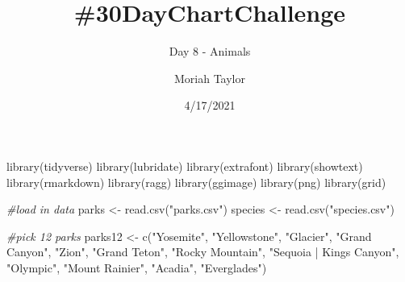 \documentclass[
]{article}
\title{\#30DayChartChallenge}
\subtitle{Day 8 - Animals}
\author{Moriah Taylor}
\date{4/17/2021}
\newenvironment{Shaded}{\begin{snugshade}}{\end{snugshade}}
\newcommand{\CommentTok}[1]{\textcolor[rgb]{0.56,0.35,0.01}{\textit{#1}}}
\newcommand{\FunctionTok}[1]{\textcolor[rgb]{0.00,0.00,0.00}{#1}}
\newcommand{\NormalTok}[1]{#1}
\newcommand{\OtherTok}[1]{\textcolor[rgb]{0.56,0.35,0.01}{#1}}
\newcommand{\StringTok}[1]{\textcolor[rgb]{0.31,0.60,0.02}{#1}}
\begin{document}
\maketitle

\begin{Shaded}
\begin{Highlighting}[]
\FunctionTok{library}\NormalTok{(tidyverse)}
\FunctionTok{library}\NormalTok{(lubridate)}
\FunctionTok{library}\NormalTok{(extrafont)}
\FunctionTok{library}\NormalTok{(showtext)}
\FunctionTok{library}\NormalTok{(rmarkdown)}
\FunctionTok{library}\NormalTok{(ragg)}
\FunctionTok{library}\NormalTok{(ggimage)}
\FunctionTok{library}\NormalTok{(png)}
\FunctionTok{library}\NormalTok{(grid)}
\end{Highlighting}
\end{Shaded}

\begin{Shaded}
\begin{Highlighting}[]
\CommentTok{\#load in data}
\NormalTok{parks }\OtherTok{\textless{}{-}} \FunctionTok{read.csv}\NormalTok{(}\StringTok{"parks.csv"}\NormalTok{)}
\NormalTok{species }\OtherTok{\textless{}{-}} \FunctionTok{read.csv}\NormalTok{(}\StringTok{"species.csv"}\NormalTok{)}
\end{Highlighting}
\end{Shaded}

\begin{Shaded}
\begin{Highlighting}[]
\CommentTok{\#pick 12 parks}
\NormalTok{parks12 }\OtherTok{\textless{}{-}} \FunctionTok{c}\NormalTok{(}\StringTok{"Yosemite"}\NormalTok{, }\StringTok{"Yellowstone"}\NormalTok{, }\StringTok{"Glacier"}\NormalTok{, }\StringTok{"Grand Canyon"}\NormalTok{, }\StringTok{"Zion"}\NormalTok{,}
             \StringTok{"Grand Teton"}\NormalTok{, }\StringTok{"Rocky Mountain"}\NormalTok{, }\StringTok{"Sequoia | Kings Canyon"}\NormalTok{, }
             \StringTok{"Olympic"}\NormalTok{, }\StringTok{"Mount Rainier"}\NormalTok{, }\StringTok{"Acadia"}\NormalTok{, }\StringTok{"Everglades"}\NormalTok{)}
\end{Highlighting}
\end{Shaded}
\end{document}
